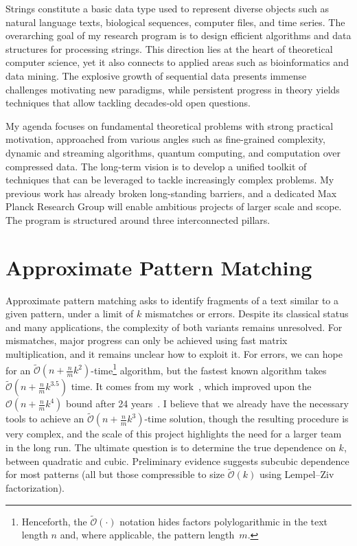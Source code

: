 \documentclass[a4paper,11pt]{article}
\newcommand{\Oh}{\mathcal{O}}
\newcommand{\Ohtilde}{\tilde{\mathcal{O}}}
\begin{document}
\thispagestyle{firststyle}

Strings constitute a basic data type used to represent diverse objects such as natural language texts, biological sequences, computer files, and time series. 
The overarching goal of my research program is to design efficient algorithms and data structures for processing strings. 
This direction lies at the heart of theoretical computer science, yet it also connects to applied areas such as bioinformatics and data mining. 
The explosive growth of sequential data presents immense challenges motivating new paradigms, while persistent progress in theory yields techniques that allow tackling decades-old open questions.

My agenda focuses on fundamental theoretical problems with strong practical motivation, approached from various angles such as fine-grained complexity, dynamic and streaming algorithms, quantum computing, and computation over compressed data. 
The long-term vision is to develop a unified toolkit of techniques that can be leveraged to tackle increasingly complex problems. 
My previous work has already broken long-standing barriers, and a dedicated Max Planck Research Group will enable ambitious projects of larger scale and scope. 
The program is structured around three interconnected pillars.

\section{Approximate Pattern Matching}

Approximate pattern matching asks to identify fragments of a text similar to a given pattern, under a limit of $k$ mismatches or errors. 
Despite its classical status and many applications, the complexity of both variants remains unresolved. 
For mismatches, major progress can only be achieved using fast matrix multiplication, and it remains unclear how to exploit it. 
For errors, we can hope for an $\Ohtilde(n+\tfrac{n}{m}k^{2})$-time\footnote{Henceforth, the $\Ohtilde(\cdot)$ notation hides factors polylogarithmic in the text length $n$ and, where applicable, the pattern length~$m$.} algorithm, but the fastest known algorithm takes $\Ohtilde(n+\tfrac{n}{m}k^{3.5})$ time. 
It comes from my work~\cite{CKW22}, which improved upon the $\Oh(n+\tfrac{n}{m}k^4)$ bound after 24 years~\cite{CH98}.  
I believe that we already have the necessary tools to achieve an $\Ohtilde(n+\tfrac{n}{m}k^{3})$-time solution, though the resulting procedure is very complex, and the scale of this project highlights the need for a larger team in the long run. 
The ultimate question is to determine the true dependence on $k$, between quadratic and cubic. 
Preliminary evidence suggests subcubic dependence for most patterns (all but those compressible to size $\Ohtilde(k)$ using Lempel--Ziv factorization).  
\end{document}
